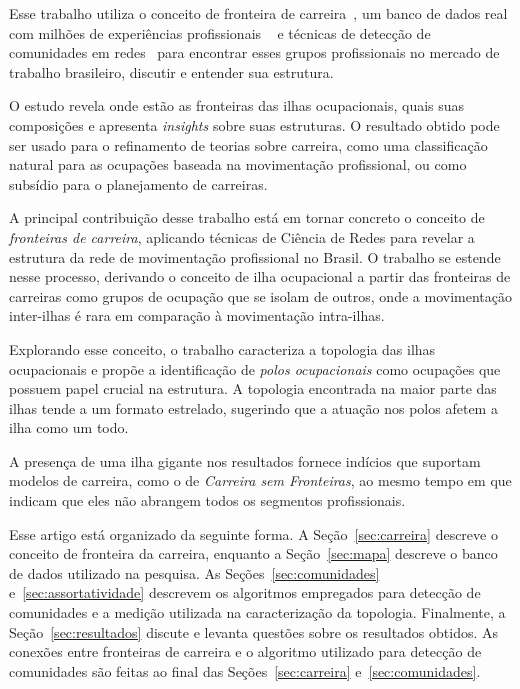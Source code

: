 \documentclass[
  article,
  11pt,
  a4paper,
  english,
  brazil,
  sumario=tradicional]{abntex2}
\begin{document}
Esse trabalho utiliza o conceito de fronteira de carreira~\cite{Gunz2007-hr}, um banco de dados real com milhões de experiências profissionais ~\cite{VAGAS_Tecnologia2015-yv} e técnicas de detecção de comunidades em redes~\cite{Rosvall2009-sd} para encontrar esses grupos profissionais no mercado de trabalho brasileiro, discutir e entender sua estrutura.

O estudo revela onde estão as fronteiras das ilhas ocupacionais, quais suas composições e apresenta \textit{insights} sobre suas estruturas. O resultado obtido pode ser usado para o refinamento de teorias sobre carreira, como uma classificação natural para as ocupações baseada na movimentação profissional, ou como subsídio para o planejamento de carreiras.

A principal contribuição desse trabalho está em tornar concreto o conceito de \textit{fronteiras de carreira}, aplicando técnicas de Ciência de Redes para revelar a estrutura da rede de movimentação profissional no Brasil. O trabalho se estende nesse processo, derivando o conceito de ilha ocupacional a partir das fronteiras de carreiras como grupos de ocupação que se isolam de outros, onde a movimentação inter-ilhas é rara em comparação à movimentação intra-ilhas.

Explorando esse conceito, o trabalho caracteriza a topologia das ilhas ocupacionais e propõe a identificação de \textit{polos ocupacionais} como ocupações que possuem papel crucial na estrutura. A topologia encontrada na maior parte das ilhas tende a um formato estrelado, sugerindo que a atuação nos polos afetem a ilha como um todo.

A presença de uma ilha gigante nos resultados fornece indícios que suportam modelos de carreira, como o de \textit{Carreira sem Fronteiras}, ao mesmo tempo em que indicam que eles não abrangem todos os segmentos profissionais.

Esse artigo está organizado da seguinte forma. A Seção~\ref{sec:carreira} descreve o conceito de fronteira da carreira, enquanto a Seção~\ref{sec:mapa} descreve o banco de dados utilizado na pesquisa. As Seções~\ref{sec:comunidades} e~\ref{sec:assortatividade} descrevem os algoritmos empregados para detecção de comunidades e a medição utilizada na caracterização da topologia. Finalmente, a Seção~\ref{sec:resultados} discute e levanta questões sobre os resultados obtidos. As conexões entre fronteiras de carreira e o algoritmo utilizado para detecção de comunidades são feitas ao final das Seções~\ref{sec:carreira} e~\ref{sec:comunidades}.
\end{document}
